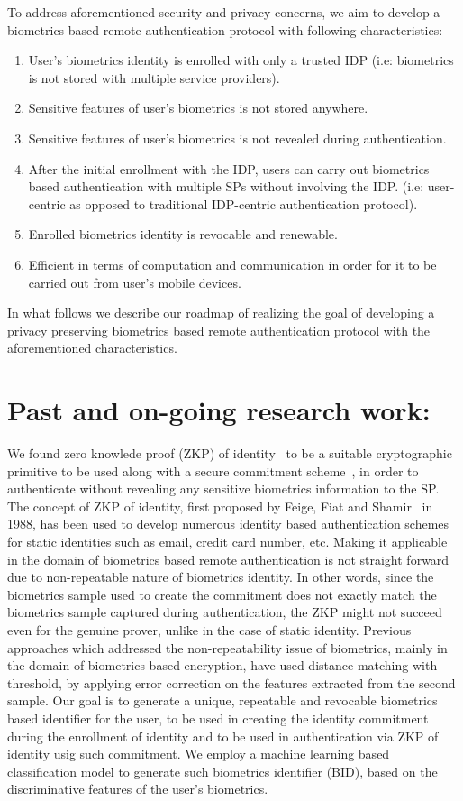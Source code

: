 \documentclass[10pt]{article}
\begin{document}
To address aforementioned security and privacy concerns, we aim to develop a biometrics based remote authentication protocol with following 
characteristics:
\begin{enumerate}
 \item User's biometrics identity is enrolled with only a trusted IDP (i.e: biometrics is not stored with multiple service providers).
 \item Sensitive features of user's biometrics is not stored anywhere.
 \item Sensitive features of user's biometrics is not revealed during authentication.
 \item After the initial enrollment with the IDP, users can carry out biometrics based authentication with multiple SPs without 
involving the IDP. (i.e: user-centric as opposed to traditional IDP-centric authentication protocol).
 \item Enrolled biometrics identity is revocable and renewable.
 \item Efficient in terms of computation and communication in order for it to be carried out from user's mobile devices.
\end{enumerate}

In what follows we describe our roadmap of realizing the goal of developing a privacy preserving biometrics based remote authentication protocol with 
the aforementioned characteristics.

\section{Past and on-going research work:}
We found zero knowlede proof (ZKP) of identity~\cite{fiat-shamir} to be a suitable cryptographic primitive to be used along with a secure commitment 
scheme~\cite{pedersenCommitment}, in order to authenticate without revealing any sensitive biometrics information to the SP. The concept of ZKP of 
identity, first proposed by Feige, Fiat and Shamir~\cite{fiat-shamir} in 1988, has been used to develop numerous identity based authentication 
schemes~\cite{idemixConcepts, DAA} for static identities such as email, credit card number, etc. Making it applicable in the domain of biometrics 
based remote authentication is not straight forward due to non-repeatable nature of biometrics identity. 
In other words, since the biometrics sample used to create the commitment does not exactly match the biometrics sample captured during 
authentication, the ZKP might not succeed even for the genuine prover, unlike in the case of static identity.
Previous approaches which addressed the non-repeatability issue of biometrics, mainly in the domain of biometrics based encryption, have used 
distance matching with threshold, by applying error correction on the features extracted from the second sample. 
Our goal is to generate a unique, repeatable and revocable biometrics based identifier for the user, to be used in creating the identity 
commitment during the enrollment of identity and to be used in authentication via ZKP of identity usig such commitment. We employ a machine 
learning based classification model to generate such biometrics identifier (BID), based on the discriminative features of the user's biometrics.
\end{document}
